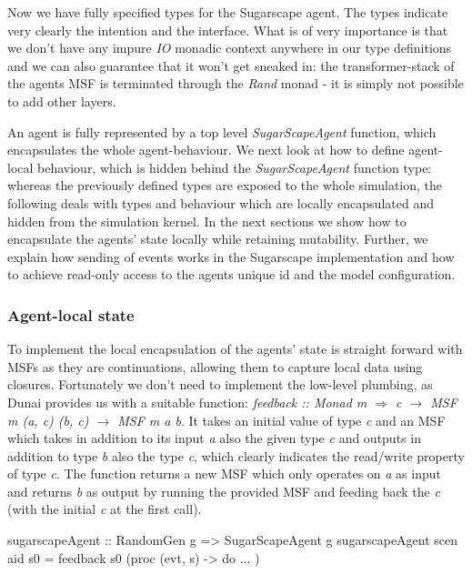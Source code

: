 Now we have fully specified types for the Sugarscape agent. The types indicate very clearly the intention and the interface. What is of very importance is that we don't have any impure \textit{IO} monadic context anywhere in our type definitions and we can also guarantee that it won't get sneaked in: the transformer-stack of the agents MSF is terminated through the \textit{Rand} monad - it is simply not possible to add other layers. 

An agent is fully represented by a top level \textit{SugarScapeAgent} function, which encapsulates the whole agent-behaviour. We next look at how to define agent-local behaviour, which is hidden behind the \textit{SugarScapeAgent} function type: whereas the previously defined types are exposed to the whole simulation, the following deals with types and behaviour which are locally encapsulated and hidden from the simulation kernel. In the next sections we show how to encapsulate the agents' state locally while retaining mutability. Further, we explain how sending of events works in the Sugarscape implementation and how to achieve read-only access to the agents unique id and the model configuration.

\subsubsection{Agent-local state}
To implement the local encapsulation of the agents' state is straight forward with MSFs as they are continuations, allowing them to capture local data using closures. Fortunately we don't need to implement the low-level plumbing, as Dunai provides us with a suitable function: \textit{feedback :: Monad m $\Rightarrow$ c $\rightarrow$ MSF m (a, c) (b, c) $\rightarrow$ MSF m a b}. It takes an initial value of type \textit{c} and an MSF which takes in addition to its input \textit{a} also the given type \textit{c} and outputs in addition to type \textit{b} also the type \textit{c}, which clearly indicates the read/write property of type \textit{c}. The function returns a new MSF which only operates on \textit{a} as input and returns \textit{b} as output by running the provided MSF and feeding back the \textit{c} (with the initial \textit{c} at the first call).

\begin{HaskellCode}
sugarscapeAgent :: RandomGen g => SugarScapeAgent g
sugarscapeAgent scen aid s0 = feedback s0 (proc (evt, s) -> do ... )
\end{HaskellCode}

